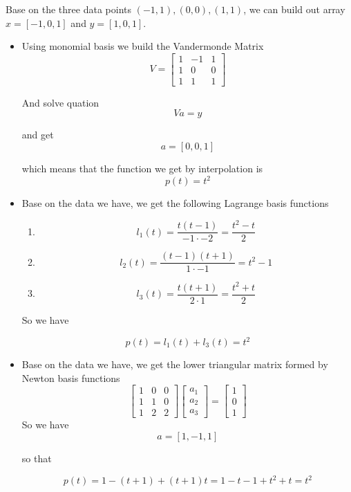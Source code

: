 \documentclass[11pt]{article}
\begin{document}
	Base on the three data points $(-1, 1), (0, 0), (1, 1)$, we can build out array $x = [-1, 0, 1]$ and $y = [1, 0, 1]$.
	\begin{itemize}
		\item Using monomial basis we build the Vandermonde Matrix
			\[V = 
			\begin{bmatrix}
				1 & -1 & 1\\
				1 & 0 & 0\\
				1 & 1 & 1
			\end{bmatrix} \]
			
			And solve quation 
			\[Va = y\]
			
			and get
			\[a = [0,0,1]\]
			
			which means that the function we get by interpolation is
			\[p(t) = t^2\]
		\item Base on the data we have, we get the following Lagrange basis functions
			\begin{enumerate}
				\item \[l_1(t) = \frac{t(t - 1)}{-1 \cdot -2} = \frac{t^2 - t}{2}\]
				\item \[l_2(t) = \frac{(t - 1)(t + 1)}{1 \cdot -1} = t^2 - 1\]
				\item \[l_3(t) = \frac{t(t + 1)}{2 \cdot 1} = \frac{t^2 + t}{2}\]
			\end{enumerate}
			
			So we have
			
			\[p(t) = l_1(t) + l_3(t) = t^2\]
		\item Base on the data we have, we get the lower triangular matrix formed by Newton basis functions
				\[\begin{bmatrix}
					1 & 0 & 0\\
					1 & 1 & 0\\
					1 & 2 & 2
				\end{bmatrix}
				\begin{bmatrix}
					a_1\\
					a_2\\
					a_3
				\end{bmatrix} = 
				\begin{bmatrix}
					1\\
					0\\
					1
				\end{bmatrix}\]
			So we have
			\[a = [1, -1, 1]\]
			
			so that
			
			\[p(t) = 1 - (t + 1) + (t + 1)t = 1 - t - 1 + t^2 + t = t^2\]
	\end{itemize}
\end{document}
